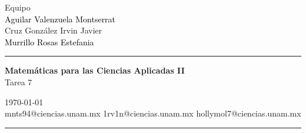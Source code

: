 \documentclass[a4paper,10pt]{article}
\begin{document}
\fancyhead[C]{}
\begin{minipage}{0.295\textwidth} 
\raggedright
Equipo\\    
\footnotesize 
\colorbox[rgb]{1.0, 1.0, 0.4}{\textcolor{black}{Aguilar Valenzuela Montserrat}}
\\\colorbox[rgb]{0.58, 0.77, 0.45}{Cruz González Irvin Javier}
\\\colorbox[rgb]{0.99, 0.76, 0.8}{\textcolor{black}{Murrillo Rosas Estefania}}
\textcolor[rgb]{1.0, 0.0, 0.31}{\medskip\hrule}
\end{minipage}
\begin{minipage}{0.4\textwidth} 
\centering 
\large 
\textbf{Matemáticas para las Ciencias Aplicadas II}\\ 
\normalsize 
Tarea 7\\
\end{minipage}
\begin{minipage}{0.295\textwidth} 
\raggedleft
\today\\ 
\footnotesize
mnts94@ciencias.unam.mx
1rv1n@ciencias.unam.mx
hollymol7@ciencias.unam.mx 
\textcolor[rgb]{1.0, 0.0, 0.31}{\medskip\hrule}
\end{minipage}
\end{document}
